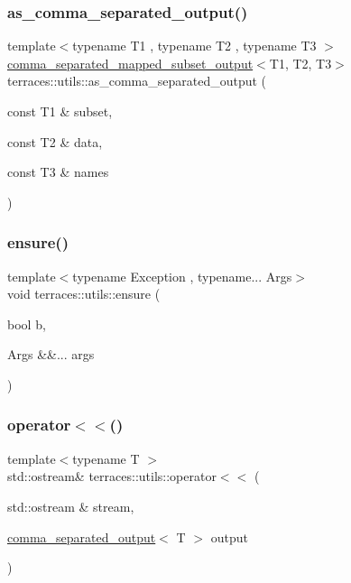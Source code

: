 \subsubsection{\texorpdfstring{as\+\_\+comma\+\_\+separated\+\_\+output()}{as\_comma\_separated\_output()}\hspace{0.1cm}{\footnotesize\ttfamily [3/3]}}
{\footnotesize\ttfamily template$<$typename T1 , typename T2 , typename T3 $>$ \\
\hyperlink{structterraces_1_1utils_1_1comma__separated__mapped__subset__output}{comma\+\_\+separated\+\_\+mapped\+\_\+subset\+\_\+output}$<$T1, T2, T3$>$ terraces\+::utils\+::as\+\_\+comma\+\_\+separated\+\_\+output (\begin{DoxyParamCaption}\item[{const T1 \&}]{subset,  }\item[{const T2 \&}]{data,  }\item[{const T3 \&}]{names }\end{DoxyParamCaption})}

\mbox{\label{namespaceterraces_1_1utils_aae29deaf7ae1e950beddb248d2591ce2}} 
\subsubsection{\texorpdfstring{ensure()}{ensure()}}
{\footnotesize\ttfamily template$<$typename Exception , typename... Args$>$ \\
void terraces\+::utils\+::ensure (\begin{DoxyParamCaption}\item[{bool}]{b,  }\item[{Args \&\&...}]{args }\end{DoxyParamCaption})}

\mbox{\label{namespaceterraces_1_1utils_a5e3d378a88978234fe3a4adc9bea47b9}} 
\subsubsection{\texorpdfstring{operator$<$$<$()}{operator<<()}\hspace{0.1cm}{\footnotesize\ttfamily [1/3]}}
{\footnotesize\ttfamily template$<$typename T $>$ \\
std\+::ostream\& terraces\+::utils\+::operator$<$$<$ (\begin{DoxyParamCaption}\item[{std\+::ostream \&}]{stream,  }\item[{\hyperlink{structterraces_1_1utils_1_1comma__separated__output}{comma\+\_\+separated\+\_\+output}$<$ T $>$}]{output }\end{DoxyParamCaption})}

